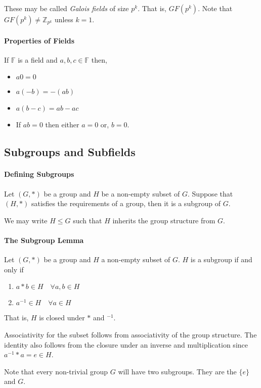 These may be called \textit{Galois fields} of size \(p^k\). That is,
\(GF(p^k)\).
Note that \(GF(p^k) \neq \mathbb{Z}_{p^k}\) unless \(k = 1\).

\paragraph{Properties of Fields}
If \(\mathbb{F}\) is a field and \(a, b, c \in \mathbb{F}\) then,
\begin{itemize}
    \item \(a0 = 0\)
    \item \(a(-b) = -(ab)\)
    \item \(a(b-c) = ab - ac\)
    \item If \(ab = 0\) then either \(a = 0\) or, \(b = 0\).
\end{itemize}

\subsection{Subgroups and Subfields}

\paragraph{Defining Subgroups}
Let \((G, *)\)  be a group and \(H\) be a non-empty subset of \(G\).
Suppose that \((H, *)\) satisfies the requirements of a group, then it is a
subgroup of \(G\).

We may write \(H \leq G\) such that \(H\) inherits the group structure from
\(G\).

\paragraph{The Subgroup Lemma}
Let \((G, *)\) be a group and \(H\) a non-empty subset of \(G\).
\(H\) is a subgroup if and only if
\begin{enumerate}
    \item \(a*b \in H \quad \forall a,b \in H\)
    \item \(a^{-1} \in H \quad \forall a\in H\)
\end{enumerate}
That is, \(H\) is closed under \(*\) and \( ^{-1}\).

Associativity for the subset follows from associativity of the group
structure. The identity also follows from the closure under an inverse
and multiplication since \(a^{-1}*a = e \in H\).

Note that every non-trivial group \(G\) will have two subgroups.
They are the \(\{e\}\) and \(G\).

